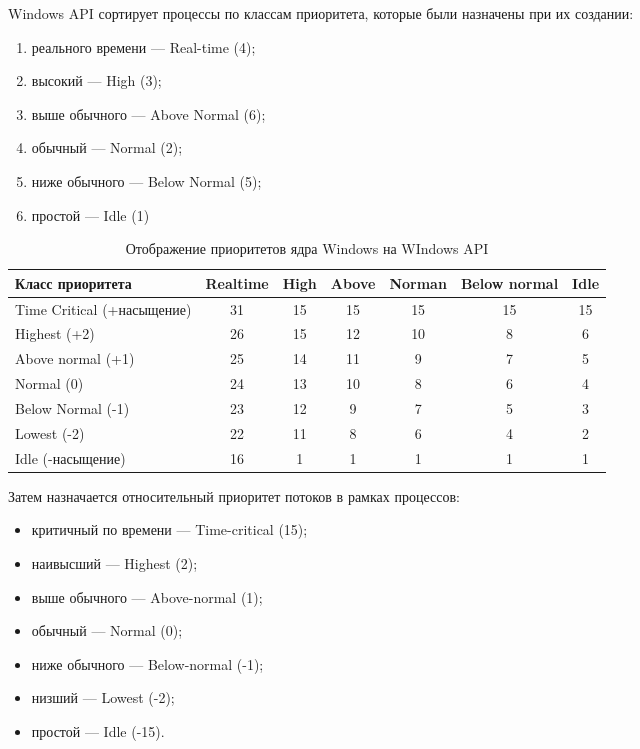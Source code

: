 \documentclass[12pt]{report}
\begin{document}
Windows API сортирует процессы по классам приоритета, которые были назначены при их создании:
\begin{enumerate}
	\item	реального времени — Real-time (4);
	\item	высокий — High (3);
	\item	выше обычного — Above Normal (6);
	\item	обычный — Normal (2);
	\item	ниже обычного — Below Normal (5);
	\item	простой — Idle (1)
\end{enumerate}

\begin{table}[H]
	\centering
	\begin{tabular}{|l| c | c | c | c | c | c |} 
		\hline
		Класс приоритета & Realtime &  High & Above & Norman & Below normal & Idle\\ [0.5ex] 
		\hline\hline
		Time Critical (+насыщение) & 31 & 15 & 15 & 15 & 15 & 15 \\
		\hline
		Highest (+2) & 26 & 15 & 12 & 10 & 8 & 6 \\
		\hline
		Above normal (+1) & 25 & 14 & 11 & 9 & 7 & 5\\
		\hline
		Normal (0) & 24 & 13 & 10 & 8 & 6 & 4\\
		\hline
		Below Normal (-1) & 23 & 12 & 9 & 7 & 5 & 3\\
		\hline
		Lowest (-2) & 22 & 11 & 8 & 6 & 4 & 2\\
		\hline
		Idle (-насыщение) & 16 & 1 & 1 & 1 & 1 & 1\\
		\hline
	\end{tabular}
	\caption{Отображение приоритетов ядра Windows на WIndows API}
\end{table}
Затем назначается относительный приоритет потоков в рамках процессов:

\begin{itemize}
	\item	критичный по времени — Time-critical (15);
	\item	наивысший — Highest (2);
	\item	выше обычного — Above-normal (1);
	\item	обычный — Normal (0);
	\item	ниже обычного — Below-normal (-1);
	\item	низший — Lowest (-2);
	\item	простой — Idle (-15).
\end{itemize}
	
\end{document}
